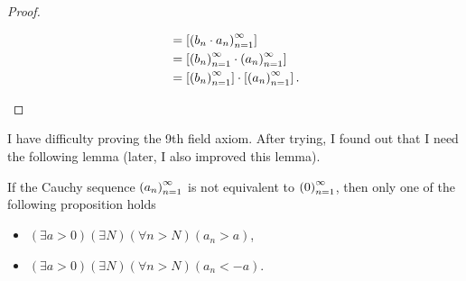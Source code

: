 \begin{proof}
\begin{enumerate}[label={(F\arabic*)},itemsep=0pt,topsep=0pt,start=5]
\begin{align*}
                                                              & = \left[{{\left({b_{n}\cdot a_{n}}\right)}^{\infty}_{n=1}}\right]               \\
                                                              & = \left[{{\left({b_{n}}\right)}^{\infty}_{n=1}\cdot{\left({a_{n}}\right)}^{\infty}_{n=1}}\right]          \\
                                                              & = \left[{{\left({b_{n}}\right)}^{\infty}_{n=1}}\right]\cdot\left[{{\left({a_{n}}\right)}^{\infty}_{n=1}}\right].
              \end{align*}
    \end{enumerate}
\end{proof}

I have difficulty proving the 9th field axiom. After trying, I found out that I need the following lemma (later, I also improved this lemma).

\begin{lemma}\label{lemma:chapter1:nonzero-sequence}
    If the Cauchy sequence ${\left({a_{n}}\right)}^{\infty}_{n=1}$ is not equivalent to ${\left({0}\right)}^{\infty}_{n=1}$, then only one of the following proposition holds
    \begin{itemize}[itemsep=0pt]
        \item $(\exists a > 0)(\exists N)(\forall n > N)(a_{n} > a)$,
        \item $(\exists a > 0)(\exists N)(\forall n > N)(a_{n} < -a)$.
    \end{itemize}
\end{lemma}

